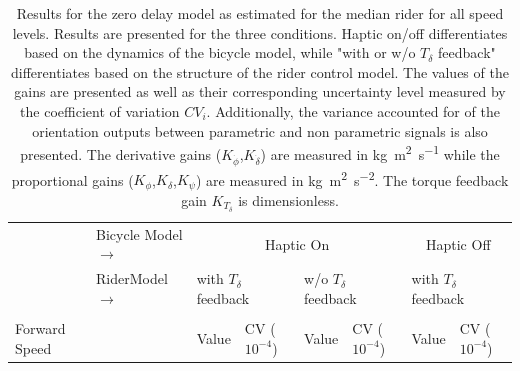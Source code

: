 \begin{table}[]
    \caption{ Results for the zero delay model as estimated for the median rider for all speed levels. Results are presented for the three conditions. Haptic on/off differentiates based on the dynamics of the bicycle model, while "with or w/o \ensuremath{T_\delta} feedback" differentiates based on the structure of the rider control model. The values of the gains are presented as well as their corresponding uncertainty level measured by the coefficient of variation \ensuremath{CV_i}. Additionally, the variance accounted for of the orientation outputs between parametric and non parametric signals is also presented. The derivative gains (\ensuremath{K_{\dot{\phi}}},\ensuremath{K_{\dot{\delta}}}) are measured in \si{\kilogram\square\meter\per\second} while the proportional gains (\ensuremath{K_{\phi}},\ensuremath{K_{\delta}},\ensuremath{K_{\psi}}) are measured in \si{\kilogram\square\meter\per\square\second}. The torque feedback gain \ensuremath{K_{T_\delta}} is dimensionless.}
    \label{tb:no_delay}
    \begin{tabular}{llcccccc}
    \hline
                                                   & Bicycle Model\;$\rightarrow$                                              & \multicolumn{4}{c}{Haptic On}                                                                                                                                                                         & \multicolumn{2}{c}{Haptic Off}                                                                    \\ \cline{2-8} 
                                                   & {\color[HTML]{333333} Rider\;\;\;\;Model\;$\rightarrow$} & \multicolumn{2}{l}{with $T_\delta$ feedback}                                                      & \multicolumn{2}{l}{w/o  $T_\delta$ feedback}                                                      & \multicolumn{2}{l}{with $T_\delta$ feedback}                                                      \\ \cline{2-8} 
                                                   &                                                                    & \multicolumn{1}{l}{}                        & \multicolumn{1}{l}{}                                & \multicolumn{1}{l}{}                        & \multicolumn{1}{l}{}                                & \multicolumn{1}{l}{}                        & \multicolumn{1}{l}{}                                \\
    \multirow{-2}{*}{Forward Speed}                &                                                                    & \multicolumn{1}{l}{\multirow{-2}{*}{Value}} & \multicolumn{1}{l}{\multirow{-2}{*}{CV ($10^{-4}$)}} & \multicolumn{1}{l}{\multirow{-2}{*}{Value}} & \multicolumn{1}{l}{\multirow{-2}{*}{CV ($10^{-4}$)}} & \multicolumn{1}{l}{\multirow{-2}{*}{Value}} & \multicolumn{1}{l}{\multirow{-2}{*}{CV ($10^{-4}$)}} \\ \hline

\end{tabular}
\end{table}
